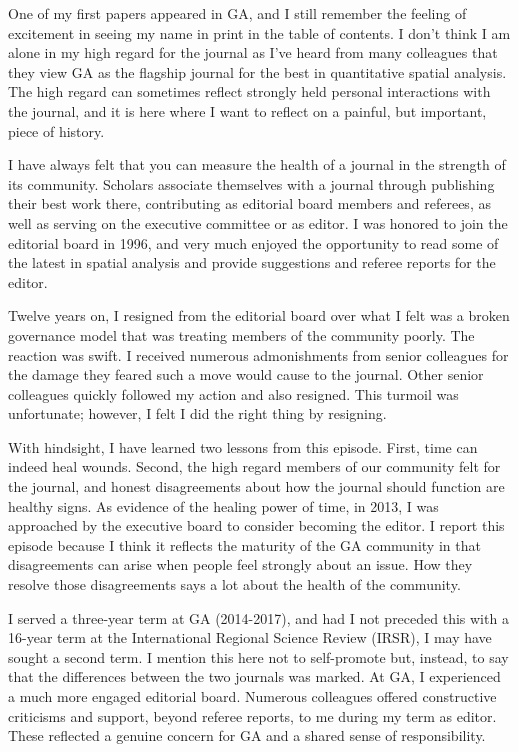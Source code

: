 \documentclass[11pt]{article}
\begin{document}
One of my first papers appeared in GA, and I still remember the feeling of
excitement in seeing my name in print in the table of contents. I don't think I
am alone in my high regard for the journal as I've heard from many colleagues
that they view GA as the flagship journal for the best in quantitative spatial
analysis. The high regard can sometimes reflect strongly held personal
interactions with the journal, and it is here where I want to reflect on a
painful, but important, piece of history.

I have always felt that you can measure the health of a journal in the strength
of its community. Scholars associate themselves with a
journal through publishing their best work there, contributing as
editorial board members and referees, as well as serving on the executive
committee or as editor. I was honored to join the editorial board in 1996, and
very much enjoyed the opportunity to read some of the latest in spatial analysis
and provide suggestions and referee reports for the editor.

Twelve years on, I resigned from the editorial board over what I felt was a
broken governance model that was treating members of the community poorly. The
reaction was swift. I received numerous admonishments from senior colleagues for
the damage they feared such a move would cause to the journal. Other senior
colleagues quickly followed my action and also resigned. This turmoil was
unfortunate; however, I felt I did the right thing by resigning.

With hindsight, I have learned two lessons from this episode. First, time can
indeed heal wounds. Second, the high regard members of our community felt for
the journal, and honest disagreements about how the journal should function are
healthy signs. As evidence of the healing power of time, in 2013, I
was approached by the executive board to consider becoming the editor. I report
this episode because I think it reflects the maturity of the GA community in that
disagreements can arise when people feel strongly about an issue. How they
resolve those disagreements says a lot about the health of the community.

I served a three-year term at GA (2014-2017), and had I not preceded this with
a 16-year term at the International Regional Science Review (IRSR), I may have
sought a second term. I mention this here not to self-promote but, instead, to
say that the differences between the two journals was marked. At GA, I experienced a much more engaged editorial board.
Numerous colleagues offered constructive criticisms and support, beyond referee
reports, to me during my term as editor. These reflected a genuine concern for
GA and a shared sense of responsibility.
\end{document}
